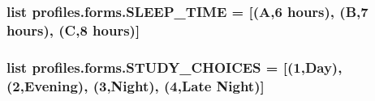 \subsubsection[{\texorpdfstring{S\+L\+E\+E\+P\+\_\+\+T\+I\+ME}{SLEEP_TIME}}]{\setlength{\rightskip}{0pt plus 5cm}list profiles.\+forms.\+S\+L\+E\+E\+P\+\_\+\+T\+I\+ME = \mbox{[}(\textquotesingle{}A\textquotesingle{},\textquotesingle{}6 hours\textquotesingle{}), (\textquotesingle{}B\textquotesingle{},\textquotesingle{}7 hours\textquotesingle{}), (\textquotesingle{}C\textquotesingle{},\textquotesingle{}8 hours\textquotesingle{})\mbox{]}}\hypertarget{namespaceprofiles_1_1forms_acb9c66af99ba661b6011aac17a7cc825}{}\label{namespaceprofiles_1_1forms_acb9c66af99ba661b6011aac17a7cc825}
\subsubsection[{\texorpdfstring{S\+T\+U\+D\+Y\+\_\+\+C\+H\+O\+I\+C\+ES}{STUDY_CHOICES}}]{\setlength{\rightskip}{0pt plus 5cm}list profiles.\+forms.\+S\+T\+U\+D\+Y\+\_\+\+C\+H\+O\+I\+C\+ES = \mbox{[}(\textquotesingle{}1\textquotesingle{},\textquotesingle{}Day\textquotesingle{}),(\textquotesingle{}2\textquotesingle{},\textquotesingle{}Evening\textquotesingle{}), (\textquotesingle{}3\textquotesingle{},\textquotesingle{}Night\textquotesingle{}), (\textquotesingle{}4\textquotesingle{},\textquotesingle{}Late Night\textquotesingle{})\mbox{]}}\hypertarget{namespaceprofiles_1_1forms_ad18051c2e7ed6d9b9a9a01f28dca7e06}{}\label{namespaceprofiles_1_1forms_ad18051c2e7ed6d9b9a9a01f28dca7e06}
